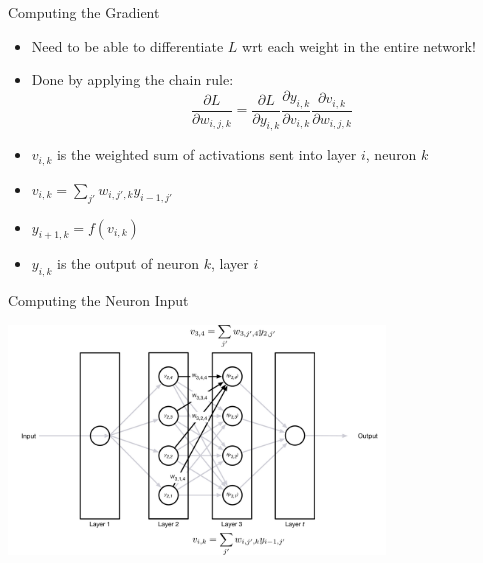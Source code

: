 \documentclass[aspectratio=169]{beamer}
\begin{document}
\begin{frame}{Computing the Gradient}

\begin{itemize}
	\item Need to be able to differentiate $L$ wrt each weight in the entire network!
	\item Done by applying the chain rule:
	$$ \frac{\partial L}{\partial w_{i,j,k}} = \frac{\partial L}{\partial y_{i,k}} 
						\frac{\partial y_{i,k}}{\partial v_{i,k}}
						\frac{\partial v_{i,k}}{\partial w_{i,j,k}}$$
	\item $v_{i,k}$ is the weighted sum of activations sent into layer $i$, neuron $k$
	\item $v_{i,k} = \sum_{j'} w_{i,j',k} y_{i-1,j'}$
	\item $y_{i+1, k} = f(v_{i,k})$
	\item $y_{i,k}$ is the output of neuron $k$, layer $i$
\end{itemize}
\end{frame}
\begin{frame}{Computing the Neuron Input}

\includegraphics[width=0.75\textwidth]{lectBP/nnbpComputeG.pdf}
\end{frame}
\end{document}
